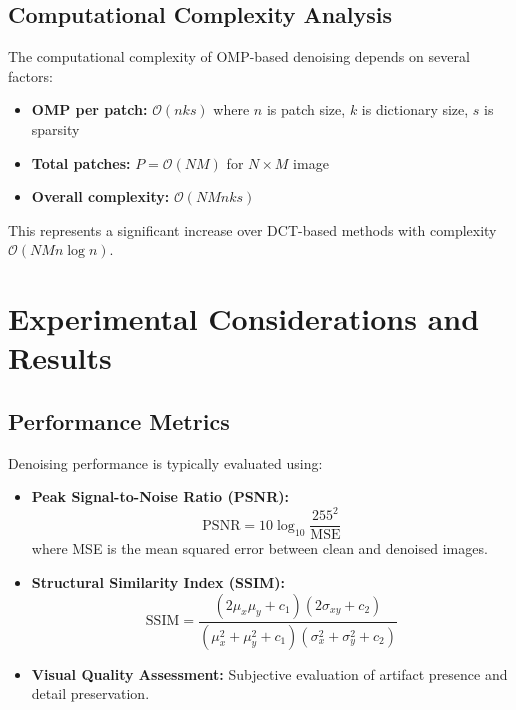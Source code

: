 \documentclass[12pt]{article}
\theoremstyle{definition}
\begin{document}
\subsection{Computational Complexity Analysis}
\label{subsec:complexity}

The computational complexity of OMP-based denoising depends on several factors:

\begin{itemize}[leftmargin=*]
    \item \textbf{OMP per patch:} $\mathcal{O}(nks)$ where $n$ is patch size, $k$ is dictionary size, $s$ is sparsity
    \item \textbf{Total patches:} $P = \mathcal{O}(NM)$ for $N \times M$ image
    \item \textbf{Overall complexity:} $\mathcal{O}(NMnks)$
\end{itemize}

This represents a significant increase over DCT-based methods with complexity $\mathcal{O}(NMn \log n)$.

\newpage

\section{Experimental Considerations and Results}
\label{sec:experimental}

\subsection{Performance Metrics}
\label{subsec:metrics}

Denoising performance is typically evaluated using:

\begin{itemize}[leftmargin=*]
    \item \textbf{Peak Signal-to-Noise Ratio (PSNR):}
          \begin{equation}
              \text{PSNR} = 10 \log_{10} \frac{255^2}{\text{MSE}}
          \end{equation}
          where MSE is the mean squared error between clean and denoised images.

    \item \textbf{Structural Similarity Index (SSIM):}
          \begin{equation}
              \text{SSIM} = \frac{(2\mu_x\mu_y + c_1)(2\sigma_{xy} + c_2)}{(\mu_x^2 + \mu_y^2 + c_1)(\sigma_x^2 + \sigma_y^2 + c_2)}
          \end{equation}

    \item \textbf{Visual Quality Assessment:} Subjective evaluation of artifact presence and detail preservation.
\end{itemize}
\end{document}
